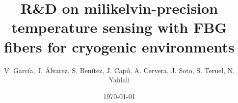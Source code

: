 \documentclass[preprint,11pt]{elsarticle}
\begin{document}
\begin{frontmatter}



\title{R\&D on milikelvin-precision temperature sensing with FBG fibers for cryogenic environments}






\author{ 
V. García, J. Álvarez, S. Benítez, J. Capó, A. Cervera, J. Soto, S. Teruel, N. Yahlali}






\date{\today}

\begin{abstract}


\end{abstract}
\end{frontmatter}
\end{document}
